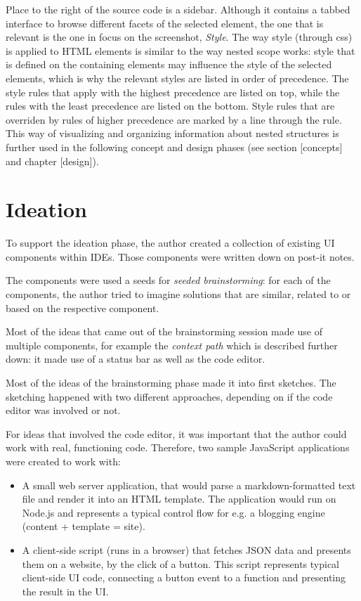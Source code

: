 Place to the right of the source code is a sidebar. Although it contains
a tabbed interface to browse different facets of the selected element,
the one that is relevant is the one in focus on the screenshot,
\emph{Style}. The way style (through \ac{css}) is applied to HTML
elements is similar to the way nested scope works: style that is defined
on the containing elements may influence the style of the selected
elements, which is why the relevant styles are listed in order of
precedence. The style rules that apply with the highest precedence are
listed on top, while the rules with the least precedence are listed on
the bottom. Style rules that are overriden by rules of higher precedence
are marked by a line through the rule. This way of visualizing and
organizing information about nested structures is further used in the
following concept and design phases (see section {[}concepts{]} and
chapter {[}design{]}).

\section{Ideation}\label{ideation}

To support the ideation phase, the author created a collection of
existing UI components within IDEs. Those components were written down
on post-it notes.

The components were used a seeds for \emph{seeded brainstorming}: for
each of the components, the author tried to imagine solutions that are
similar, related to or based on the respective component.

Most of the ideas that came out of the brainstorming session made use of
multiple components, for example the \emph{context path} which is
described further down: it made use of a status bar as well as the code
editor.

Most of the ideas of the brainstorming phase made it into first
sketches. The sketching happened with two different approaches,
depending on if the code editor was involved or not.

For ideas that involved the code editor, it was important that the
author could work with real, functioning code. Therefore, two sample
JavaScript applications were created to work with:

\begin{itemize}
\itemsep1pt\parskip0pt
\item
  A small web server application, that would parse a markdown-formatted
  text file and render it into an HTML template. The application would
  run on Node.js and represents a typical control flow for e.g. a
  blogging engine (content + template = site).
\item
  A client-side script (runs in a browser) that fetches JSON data and
  presents them on a website, by the click of a button. This script
  represents typical client-side UI code, connecting a button event to a
  function and presenting the result in the UI.
\end{itemize}

